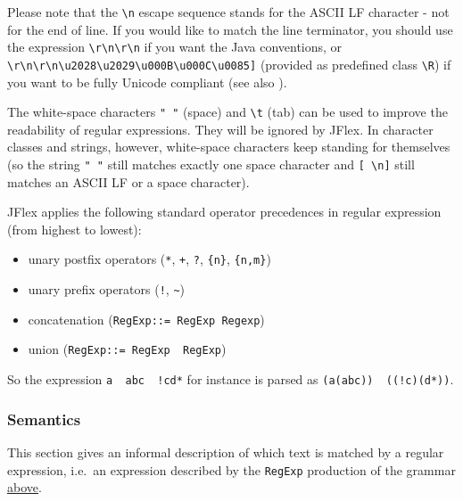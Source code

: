 Please note that the \texttt{\textbackslash{}n} escape sequence stands
for the ASCII LF character - not for the end of line. If you would like
to match the line terminator, you should use the expression
\texttt{\textbackslash{}r\textbar{}\textbackslash{}n\textbar{}\textbackslash{}r\textbackslash{}n}
if you want the Java conventions, or
\texttt{\textbackslash{}r\textbackslash{}n\textbar{}{[}\textbackslash{}r\textbackslash{}n\textbackslash{}u2028\textbackslash{}u2029\textbackslash{}u000B\textbackslash{}u000C\textbackslash{}u0085{]}}
(provided as predefined class \texttt{\textbackslash{}R}) if you want to
be fully Unicode compliant (see also \autocite{unicode_rep}).

The white-space characters \texttt{"\ "} (space) and
\texttt{\textbackslash{}t} (tab) can be used to improve the readability
of regular expressions. They will be ignored by JFlex. In character
classes and strings, however, white-space characters keep standing for
themselves (so the string \texttt{"\ "} still matches exactly one space
character and \texttt{{[}\ \textbackslash{}n{]}} still matches an ASCII
LF or a space character).

JFlex applies the following standard operator precedences in regular
expression (from highest to lowest):

\begin{itemize}
\item
  unary postfix operators (\texttt{*}, \texttt{+}, \texttt{?},
  \texttt{\{n\}}, \texttt{\{n,m\}})
\item
  unary prefix operators (\texttt{!}, \texttt{\textasciitilde{}})
\item
  concatenation (\texttt{RegExp::=\ RegExp\ Regexp})
\item
  union
  (\texttt{RegExp::=\ RegExp\ \textquotesingle{}\textbar{}\textquotesingle{}\ RegExp})
\end{itemize}

So the expression \texttt{a\ \textbar{}\ abc\ \textbar{}\ !cd*} for
instance is parsed as
\texttt{(a\textbar{}(abc))\ \textbar{}\ ((!c)(d*))}.

\subsubsection{Semantics}\label{Semantics}

This section gives an informal description of which text is matched by a
regular expression, i.e.~an expression described by the \texttt{RegExp}
production of the grammar \hyperref[Grammar]{above}.

